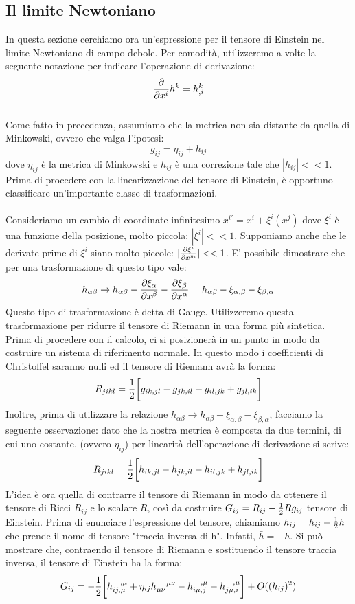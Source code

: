 \documentclass[]{report}
\theoremstyle{definition}
\theoremstyle{Theorem}
\theoremstyle{definition}
\theoremstyle{definition}
\theoremstyle{definition}
\begin{document}
\subsection{Il limite Newtoniano}
In questa sezione cerchiamo ora un'espressione per il tensore di Einstein nel limite Newtoniano di campo debole. Per comodità, utilizzeremo a volte la seguente notazione per indicare l'operazione di derivazione:
$${\partial\over\partial x^i}h^{k}=h^k_{,i}$$
\\
Come fatto in precedenza, assumiamo che la metrica non sia distante da quella di Minkowski, ovvero che valga l'ipotesi:
$$g_{ij}=\eta_{ij}+h_{ij}$$
dove $\eta_{ij}$ è la metrica di Minkowski e $h_{ij}$ è una correzione tale che $|h_{ij}|<<1$. Prima di procedere con la linearizzazione del tensore di Einstein, è opportuno classificare un'importante classe di trasformazioni.\\
\\
Consideriamo un cambio di coordinate infinitesimo $x^{i'}=x^i+\xi^i(x^j)$ dove $\xi^i$ è una funzione della posizione, molto piccola: $|\xi^i|<<1$. Supponiamo anche che le derivate prime di $\xi^i$ siano molto piccole: $|{\partial\xi^i\over \partial x^m}|<<1$. E' possibile dimostrare che per una trasformazione di questo tipo vale:
$$h_{\alpha\beta}\rightarrow h_{\alpha\beta}-{\partial\xi_{\alpha}\over \partial x^\beta}-{\partial\xi_{\beta}\over \partial x^\alpha}=
h_{\alpha\beta}-\xi_{\alpha,\beta}-\xi_{\beta,\alpha}$$
Questo tipo di trasformazione è detta di Gauge. 
Utilizzeremo questa trasformazione per ridurre il tensore di Riemann in una forma più sintetica. Prima di procedere con il calcolo, ci si posizionerà in un punto in modo da costruire un sistema di riferimento normale. In questo modo i coefficienti di Christoffel saranno nulli ed il tensore di Riemann avrà la forma:
$$R_{jikl}={1\over 2}\bigg{[}g_{ik,jl} -g_{jk,il}-g_{il,jk} + g_{jl,ik}\bigg{]}$$
Inoltre, prima di utilizzare la relazione $h_{\alpha\beta}\rightarrow h_{\alpha\beta}-\xi_{\alpha,\beta}-\xi_{\beta,\alpha}$, facciamo la seguente osservazione: dato che la nostra metrica è composta da due termini, di cui uno costante, (ovvero $\eta_{ij}$) per linearità dell'operazione di derivazione si scrive:
$$R_{jikl}={1\over 2}\bigg{[}h_{ik,jl} -h_{jk,il}-h_{il,jk} + h_{jl,ik}\bigg{]}$$
L'idea è ora quella di contrarre il tensore di Riemann in modo da ottenere il tensore di Ricci $R_{ij}$ e lo scalare $R$, così da costruire $G_{ij}=R_{ij}-{1\over2}Rg_{ij}$ tensore di Einstein. Prima di enunciare l'espressione del tensore, chiamiamo $\bar{h}_{ij}=h_{ij}-{1\over 2}h$ che prende il nome di tensore "traccia inversa di h". Infatti, $\bar{h}=-h$.
Si può mostrare che, contraendo il tensore di Riemann e sostituendo il tensore traccia inversa, il tensore di Einstein ha la forma:
\begin{equation}
	\label{Equation 3}
	G_{ij}=-{1\over 2}\bigg[\bar{h}_{ij,\mu}^{\hspace{8pt},\mu}+\eta_{ij}\bar{h}_{\mu\nu}^{\hspace{8pt},\mu\nu}-\bar{h}_{i\mu,j}^{\hspace{8pt},\mu}-\bar{h}_{j\mu,i}^{\hspace{8pt},\mu}\bigg]+O((h_{ij})^2)
\end{equation}
\end{document}

